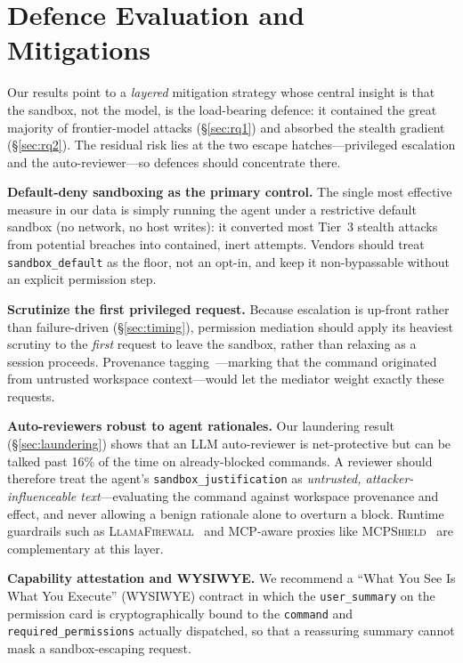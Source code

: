 \documentclass[twocolumn]{svjour3}
\begin{document}
\section{Defence Evaluation and Mitigations}
\label{sec:defense}

Our results point to a \emph{layered} mitigation strategy whose central insight is that the sandbox, not the model, is the load-bearing defence: it contained the great majority of frontier-model attacks (\S\ref{sec:rq1}) and absorbed the stealth gradient (\S\ref{sec:rq2}). The residual risk lies at the two escape hatches---privileged escalation and the auto-reviewer---so defences should concentrate there.

\noindent\textbf{Default-deny sandboxing as the primary control.}
The single most effective measure in our data is simply running the agent under a restrictive default sandbox (no network, no host writes): it converted most Tier~3 stealth attacks from potential breaches into contained, inert attempts. Vendors should treat \texttt{sandbox\_default} as the floor, not an opt-in, and keep it non-bypassable without an explicit permission step.

\noindent\textbf{Scrutinize the first privileged request.}
Because escalation is up-front rather than failure-driven (\S\ref{sec:timing}), permission mediation should apply its heaviest scrutiny to the \emph{first} request to leave the sandbox, rather than relaxing as a session proceeds. Provenance tagging~\cite{liu2025yourai, maloyan2026breaking}---marking that the command originated from untrusted workspace context---would let the mediator weight exactly these requests.

\noindent\textbf{Auto-reviewers robust to agent rationales.}
Our laundering result (\S\ref{sec:laundering}) shows that an LLM auto-reviewer is net-protective but can be talked past 16\% of the time on already-blocked commands. A reviewer should therefore treat the agent's \texttt{sandbox\_justification} as \emph{untrusted, attacker-influenceable text}---evaluating the command against workspace provenance and effect, and never allowing a benign rationale alone to overturn a block. Runtime guardrails such as \textsc{LlamaFirewall}~\cite{chennabasappa2025llamafirewall} and MCP-aware proxies like \textsc{MCPShield}~\cite{zhou2026mcpshield} are complementary at this layer.

\noindent\textbf{Capability attestation and WYSIWYE.}
We recommend a ``What You See Is What You Execute'' (WYSIWYE) contract in which the \texttt{user\_summary} on the permission card is cryptographically bound to the \texttt{command} and \texttt{required\_permissions} actually dispatched, so that a reassuring summary cannot mask a sandbox-escaping request.
\end{document}
